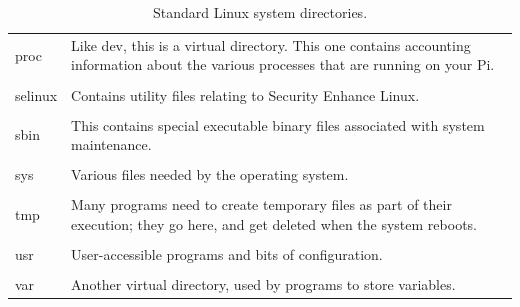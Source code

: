 \begin{table}
\begin{tabular}{lp{12cm}}
proc & Like dev, this is a virtual directory. This one contains accounting information about the various processes that are running on your Pi.\\
& \\
selinux & Contains utility files relating to Security Enhance Linux.\\
& \\
sbin & This contains special executable binary files associated with system maintenance.\\
& \\
sys & Various files needed by the operating system.\\
& \\
tmp & Many programs need to create temporary files as part of their execution; they go here, and get deleted when the system reboots.\\
& \\
usr & User-accessible programs and bits of configuration.\\
& \\
var & Another virtual directory, used by programs to store variables.\\
\hline
\end{tabular}
\caption{Standard Linux system directories.}\label{table-dirs}
\end{table}

